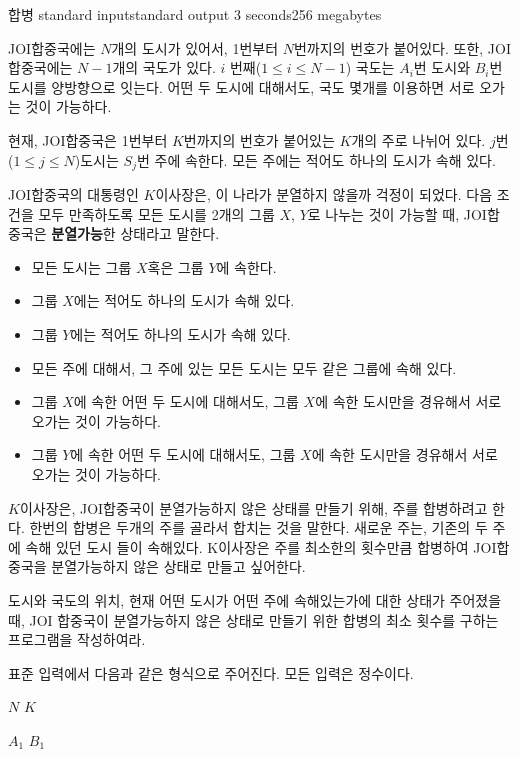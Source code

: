 \begin{problem}{합병}
	{standard input}{standard output}
	{3 seconds}{256 megabytes}{}
	
	JOI합중국에는 $N$개의 도시가 있어서, 1번부터 $N$번까지의 번호가 붙어있다. 또한, JOI합중국에는 $N-1$개의 국도가 있다. $i$ 번째($1 \le i \le N-1$) 국도는 $A_i$번 도시와 $B_i$번 도시를 양방향으로 잇는다. 어떤 두 도시에 대해서도, 국도 몇개를 이용하면 서로 오가는 것이 가능하다.
	
	현재, JOI합중국은 1번부터 $K$번까지의 번호가 붙어있는 $K$개의 주로 나뉘어 있다. $j$번 ($1 \le j \le N$)도시는 $S_j$번 주에 속한다. 모든 주에는 적어도 하나의 도시가 속해 있다.
	
	JOI합중국의 대통령인 $K$이사장은, 이 나라가 분열하지 않을까 걱정이 되었다. 다음 조건을 모두 만족하도록 모든 도시를 2개의 그룹 $X$, $Y$로 나누는 것이 가능할 때, JOI합중국은 \textbf{분열가능}한 상태라고 말한다.
	
	\begin{itemize}
		\item 모든 도시는 그룹 $X$혹은 그룹 $Y$에 속한다.
		\item 그룹 $X$에는 적어도 하나의 도시가 속해 있다.
		\item 그룹 $Y$에는 적어도 하나의 도시가 속해 있다.
		\item 모든 주에 대해서, 그 주에 있는 모든 도시는 모두 같은 그룹에 속해 있다.
		\item 그룹 $X$에 속한 어떤 두 도시에 대해서도, 그룹 $X$에 속한 도시만을 경유해서 서로 오가는 것이 가능하다.
		\item 그룹 $Y$에 속한 어떤 두 도시에 대해서도, 그룹 $X$에 속한 도시만을 경유해서 서로 오가는 것이 가능하다.
	\end{itemize}

	$K$이사장은, JOI합중국이 분열가능하지 않은 상태를 만들기 위해, 주를 합병하려고 한다. 한번의 합병은 두개의 주를 골라서 합치는 것을 말한다. 새로운 주는, 기존의 두 주에 속해 있던 도시 들이 속해있다. K이사장은 주를 최소한의 횟수만큼 합병하여 JOI합중국을 분열가능하지 않은 상태로 만들고 싶어한다.
	
	도시와 국도의 위치, 현재 어떤 도시가 어떤 주에 속해있는가에 대한 상태가 주어졌을 때, JOI 합중국이 분열가능하지 않은 상태로 만들기 위한 합병의 최소 횟수를 구하는 프로그램을 작성하여라.
	
	\InputFile
	
	표준 입력에서 다음과 같은 형식으로 주어진다. 모든 입력은 정수이다.
	
	$N$ $K$
	
	$A_1$ $B_1$
	

\end{problem}
